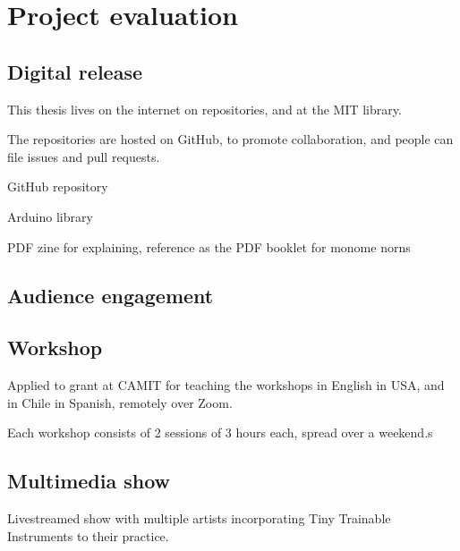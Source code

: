 \chapter{Project evaluation}

\section{Digital release}

This thesis lives on the internet on repositories, and at the MIT library. 

The repositories are hosted on GitHub, to promote collaboration, and people can file issues and pull requests.

GitHub repository

Arduino library


PDF zine for explaining, reference as the PDF booklet for monome norns

\section{Audience engagement}


\section{Workshop}

Applied to grant at CAMIT for teaching the workshops in English in USA, and in Chile in Spanish, remotely over Zoom.

Each workshop consists of 2 sessions of 3 hours each, spread over a weekend.s

\section{Multimedia show}

Livestreamed show with multiple artists incorporating Tiny Trainable Instruments to their practice.
